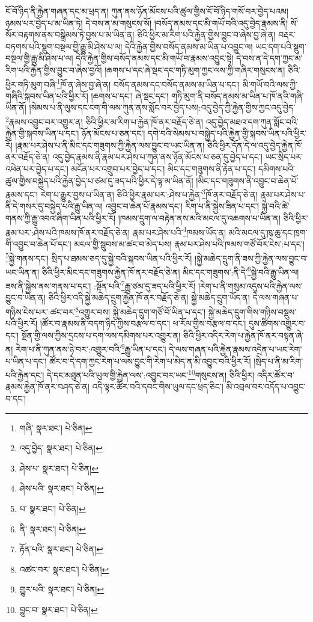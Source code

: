 ངོ་བོ་ཉིད་ནི་རྐྱེན་གཞན་དང་མ་ཕྲད་ན། ཀུན་ནས་ཉོན་མོངས་པའི་ཚུལ་གྱིས་ངོ་བོ་ཉིད་གསོ་བར་བྱེད་པའམ། ཉམས་པར་བྱེད་པ་མ་ཡིན་ཏེ། དེ་བས་ན་མ་གསུངས་སོ། །བསོད་ནམས་དང་མི་གཡོ་བའི་འདུ་བྱེད་རྣམས་ནི། སོ་སོར་བརྟགས་ནས་བསྒྲིམས་ཏེ་བྱས་པ་མ་ཡིན་ན། ཅིའི་ཕྱིར་མ་རིག་པའི་རྐྱེན་གྱིས་བྱུང་བ་ཞེས་བྱ་ཞེ་ན། བརྡར་བཏགས་པའི་སྡུག་བསྔལ་གྱི་རྒྱུ་མི་ཤེས་པ་ལ། དེའི་རྐྱེན་གྱིས་བསོད་ནམས་མ་ཡིན་པ་འབྱུང་ལ། ཡང་དག་པའི་སྡུག་བསྔལ་གྱི་རྒྱུ་མི་ཤེས་པ་ལ། དེའི་རྐྱེན་གྱིས་བསོད་ནམས་དང་མི་གཡོ་བ་རྣམས་འབྱུང་སྟེ། དེ་བས་ན་དེ་དག་ཀྱང་མ་རིག་པའི་རྐྱེན་གྱིས་བྱུང་བ་ཞེས་བྱའོ། །ཆགས་པ་དང་ཞེ་སྡང་དང་གཏི་མུག་ཀྱང་ལས་ཀྱི་གཞིར་གསུངས་ན། ཅིའི་ཕྱིར་གཏི་མུག་བཞི་\footnote{གཞི་  སྣར་ཐང་།  པེ་ཅིན། }ཁོ་ན་ཞེས་བྱ་ཞེ་ན། བསོད་ནམས་དང་བསོད་ནམས་མ་ཡིན་པ་དང་། མི་གཡོ་བའི་ལས་ཀྱི་གཞིའི་སྐབས་ཡིན་པའི་ཕྱིར་རོ། །ཆགས་པ་དང་། ཞེ་སྡང་དང་། གཏི་མུག་ནི་བསོད་ནམས་མ་ཡིན་པ་ཁོ་ནའི་གཞི་ཡིན་ནོ། །སེམས་པ་ནི་ལུས་དང་ངག་གི་ལས་ཀུན་ནས་སློང་བར་བྱེད་པས།:འདུ་བྱེད་ཀྱི་རྐྱེན་གྱིས་ཀྱང་འདུ་བྱེད་\footnote{འདུ་བྱེད་  སྣར་ཐང་།  པེ་ཅིན། }རྣམས་འབྱུང་བར་འགྱུར་ན། ཅིའི་ཕྱིར་མ་རིག་པ་རྐྱེན་ཁོ་ནར་བརྗོད་ཅེ་ན། འདུ་བྱེད་མཐའ་དག་ཀུན་སློང་བའི་རྐྱེན་གྱི་སྐབས་ཡིན་པ་དང་། ཉོན་མོངས་པ་ཅན་དང་། དགེ་བའི་སེམས་པ་བསྐྱེད་པའི་རྐྱེན་གྱི་སྐབས་ཡིན་པའི་ཕྱིར་རོ། །རྣམ་པར་ཤེས་པ་ནི་མིང་དང་གཟུགས་ཀྱི་རྐྱེན་ལས་བྱུང་བ་ཡང་ཡིན་ན། ཅིའི་ཕྱིར་དོན་དེ་ལ་འདུ་བྱེད་རྐྱེན་ཁོ་ནར་བརྗོད་ཅེ་ན། འདུ་བྱེད་རྣམས་ནི་རྣམ་པར་ཤེས་པ་ཀུན་ནས་ཉོན་མོངས་པ་ཅན་དུ་བྱེད་པ་དང་། ཡང་སྲིད་པར་འཕེན་པར་བྱེད་པ་དང་། མངོན་པར་འགྲུབ་པར་བྱེད་པ་དང་། མིང་དང་གཟུགས་ནི་རྟེན་པ་དང་། དམིགས་པའི་ཚུལ་གྱིས་བསྐྱེད་པའི་རྐྱེན་བྱེད་པ་ཙམ་དུ་ཟད་པའི་ཕྱིར་དེ་ལྟ་མ་ཡིན་ནོ། །མིང་དང་གཟུགས་ནི་འབྱུང་བ་ཆེན་པོ་རྣམས་དང་། རེག་པ་རྒྱུར་བྱས་པ་ཡིན་ན། ཅིའི་ཕྱིར་རྣམ་པར་:ཤེས་པ་རྐྱེན་\footnote{ཤེས་པ་  སྣར་ཐང་།  པེ་ཅིན། }ཁོ་ནར་བརྗོད་ཅེ་ན། རྣམ་པར་ཤེས་པ་ནི་དེ་གསར་དུ་བསྐྱེད་པའི་རྒྱུ་ཡིན་ལ། འབྱུང་བ་ཆེན་པོ་རྣམས་དང་། རིག་པ་ནི་སྐྱེས་ཟིན་པ་དང་། སྐྱེ་བའི་ཚེ་གནས་ཀྱི་རྒྱུ་འབའ་ཞིག་ཡིན་པའི་ཕྱིར་རོ། །ཁམས་དྲུག་ལ་བརྟེན་ནས་མའི་མངལ་དུ་འཆགས་པ་ཡིན་ན། ཅིའི་ཕྱིར་རྣམ་པར་:ཤེས་པའི་ཁམས་ཁོ་ནར་བརྗོད་ཅེ་ན། རྣམ་པར་ཤེས་པའི་\footnote{ཤེས་པའི་  སྣར་ཐང་།  པེ་ཅིན། }ཁམས་ཡོད་ན། མའི་མངལ་དུ་ཁུ་ཆུ་དང་ཁྲག་གི་འབྱུང་བ་ཆེན་པོ་དང་། མངལ་གྱི་སྦུབས་མ་ཚང་བ་མེད་པས། རྣམ་པར་ཤེས་པའི་ཁམས་གཙོ་བོར་ངེས་:པ་དང་། \footnote{པ་  སྣར་ཐང་།  པེ་ཅིན། }སྐྱེ་གནས་དང་། སྲིད་པ་ཐམས་ཅད་དུ་སྐྱེ་བའི་སྐབས་ཡིན་པའི་ཕྱིར་རོ། །སྐྱེ་མཆེད་དྲུག་ནི་ཟས་ཀྱི་རྐྱེན་ལས་བྱུང་བ་ཡང་ཡིན་ན། ཅིའི་ཕྱིར་མིང་དང་གཟུགས་རྐྱེན་ཁོ་ནར་བརྗོད་ཅེ་ན། མིང་དང་གཟུགས་:ནི་དེ་\footnote{ནི་  སྣར་ཐང་།  པེ་ཅིན། }སྐྱེ་བའི་རྒྱུ་ཡིན་ལ། ཟས་ནི་སྐྱེས་ནས་གནས་པ་དང་། :སྟོན་པའི་\footnote{རྟོན་པའི་  སྣར་ཐང་།  པེ་ཅིན། }རྒྱུ་ཙམ་དུ་ཟད་པའི་ཕྱིར་རོ། །རེག་པ་ནི་གསུམ་འདུས་པའི་རྐྱེན་ལས་བྱུང་བ་ཡིན་ན། ཅིའི་ཕྱིར་འདི་སྐྱེ་མཆེད་དྲུག་རྐྱེན་ཁོ་ནར་བརྗོད་ཅེ་ན། སྐྱེ་མཆེད་དྲུག་ཡོད་ན། དེ་ལས་གཞན་པ་གཉིས་ངེས་པར་:ཚང་བར་\footnote{འཚང་བར་  སྣར་ཐང་།  པེ་ཅིན། }འགྱུར་བས། སྐྱེ་མཆེད་དྲུག་གཙོ་བོ་ཡིན་པ་དང་། སྐྱེ་མཆེད་དྲུག་གིས་གཉིས་བསྡུས་པའི་ཕྱིར་རོ། །ཚོར་བ་རྣམས་ནི་བདག་ཉིད་ཀྱིས་བརྩལ་བ་དང་། ཕ་རོལ་གྱིས་བརྩལ་བ་དང་། དུས་ཚིགས་འགྱུར་བ་དང་། སྔོན་གྱི་ལས་ཀྱིས་དྲངས་པ་དག་ལས་དམིགས་པར་འགྱུར་ན། ཅིའི་ཕྱིར་འདིར་རེག་པ་རྐྱེན་ཁོ་ནར་བསྟན་ཞེ་ན། རེག་པ་ནི་ཀུན་ནས་ཉེ་བར་:འགྱུར་བའི་\footnote{གྱུར་པའི་  སྣར་ཐང་།  པེ་ཅིན། }རྒྱུ་ཡིན་པ་དང་། དེ་ལས་གཞན་པའི་རྐྱེན་རྣམས་འདྲེན་པ་ཡང་རེག་པ་ཡིན་པ་དང་། ཚོར་བ་དེ་དག་ཀྱང་རེག་པ་ལས་བྱུང་གི་རེག་པ་མེད་ན་མི་འབྱུང་བའི་ཕྱིར་རོ། །སྲེད་པ་ནི་མ་རིག་པའི་རྐྱེན་དང་། དེ་དང་མཐུན་པའི་ཡུལ་གྱི་རྐྱེན་ལས་:འབྱུང་བར་ཡང་\footnote{བྱུང་བ་  སྣར་ཐང་།  པེ་ཅིན། }གསུངས་ན། ཅིའི་ཕྱིར། འདིར་ཚོར་བ་རྣམས་རྐྱེན་ཁོ་ནར་བཤད་ཅེ་ན། འདི་ལྟར་ཚོར་བའི་དབང་གིས་ཡུལ་དང་ཕྲད་ཅིང་། མི་འབྲལ་བར་འདོད་པ་འབྱུང་བ་དང་། 
